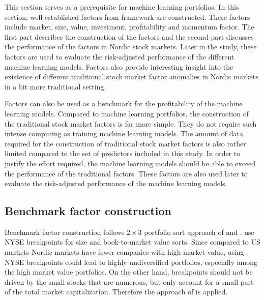 \documentclass[12pt]{article}
\begin{document}
This section serves as a prerequisite for machine learning portfolios. In this section, well-established factors from \citet{FAMA20151} framework are constructed. These factors include market, size, value, investment, profitability and momentum factor.\footnotemark {} The first part describes the construction of the factors and the second part discusses the performance of the factors in Nordic stock markets. Later in the study, these factors are used to evaluate the risk-adjusted performance of the different machine learning models. Factors also provide interesting insight into the existence of different traditional stock market factor anomalies in Nordic markets in a bit more traditional setting. \par

Factors can also be used as a benchmark for the profitability of the machine learning models. Compared to machine learning portfolios, the construction of the traditional stock market factors is far more simple. They do not require such intense computing as training machine learning models. The amount of data required for the construction of traditional stock market factors is also rather limited compared to the set of predictors included in this study. In order to justify the effort required, the machine learning models should be able to exceed the performance of the traditional factors. These factors are also used later to evaluate the risk-adjusted performance of the machine learning models.\par

\subsection{Benchmark factor construction}\label{BenchmarkFactorsConstruction}

Benchmark factor construction follows $2 \times 3$ portfolio sort approach of \citet{FAMA19933, FAMA20151} and \citet{Carhart1997}. \citet{FAMA19933} use NYSE breakpoints for size and book-to-market value sorts.\footnotemark {}  Since compared to US markets Nordic markets have fewer companies with high market value, using NYSE breakpoints could lead to highly undiversified portfolios, especially among the high market value portfolios. On the other hand, breakpoints should not be driven by the small stocks that are numerous, but only account for a small part of the total market capitalization. Therefore the approach of \citet{FAMA2012457} is applied.\footnotemark {}  \par
\end{document}

